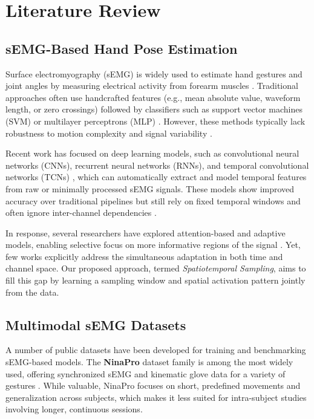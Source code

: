 \chapter{Literature Review}
\label{chap:lr}

\section{sEMG-Based Hand Pose Estimation}

Surface electromyography (sEMG) is widely used to estimate hand gestures and joint angles by measuring electrical activity from forearm muscles \cite{oskoei2007myoelectric, simao2019review}. Traditional approaches often use handcrafted features (e.g., mean absolute value, waveform length, or zero crossings) followed by classifiers such as support vector machines (SVM) or multilayer perceptrons (MLP) \cite{oladazimi2012review, liu2007recognition}. However, these methods typically lack robustness to motion complexity and signal variability \cite{parajuli2019real}.

Recent work has focused on deep learning models, such as convolutional neural networks (CNNs), recurrent neural networks (RNNs), and temporal convolutional networks (TCNs) \cite{ameri2019regression, briouza2021convolutional, zhang2023lstm}, which can automatically extract and model temporal features from raw or minimally processed sEMG signals. These models show improved accuracy over traditional pipelines but still rely on fixed temporal windows and often ignore inter-channel dependencies \cite{lee2022explainable}.

In response, several researchers have explored attention-based and adaptive models, enabling selective focus on more informative regions of the signal \cite{yang2025stcnet, hu2019semg}. Yet, few works explicitly address the simultaneous adaptation in both time and channel space. Our proposed approach, termed \textit{Spatiotemporal Sampling}, aims to fill this gap by learning a sampling window and spatial activation pattern jointly from the data.

\section{Multimodal sEMG Datasets}

A number of public datasets have been developed for training and benchmarking sEMG-based models. The \textbf{NinaPro} dataset family is among the most widely used, offering synchronized sEMG and kinematic glove data for a variety of gestures \cite{zia2018multiday}. While valuable, NinaPro focuses on short, predefined movements and generalization across subjects, which makes it less suited for intra-subject studies involving longer, continuous sessions.

